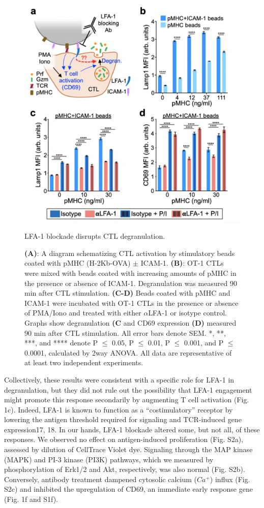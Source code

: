 \begin{figure}[htbp]
	\centering
	\includegraphics[width=1.0\columnwidth]{../figures/chapter3/fig1suppbeads.png}
	\caption{LFA-1 blockade disrupts CTL degranulation.}
	\caption*{\textbf{(A)}: A diagram schematizing CTL activation by stimulatory beads coated with pMHC (H-2Kb-OVA) $\pm$ ICAM-1. \textbf{(B)}: OT-1 CTLs were mixed with beads coated with increasing amounts of pMHC in the presence or absence of ICAM-1. Degranulation was measured 90 min after CTL stimulation. \textbf{(C-D)} Beads coated with pMHC and ICAM-1 were incubated with OT-1 CTLs in the presence or absence of PMA/Iono and treated with either $\alpha$LFA-1 or isotype control. Graphs show degranulation \textbf{(C} and CD69 expression \textbf{(D)} measured 90 min after CTL stimulation. All error bars denote SEM. *, **, ***, and **** denote P $\leq$ 0.05, P $\leq$ 0.01, P $\leq$ 0.001, and P $\leq$ 0.0001, calculated by 2way ANOVA. All data are representative of at least two independent experiments.}
	\label{fig:fig1suppbeads}
\end{figure} 
 
Collectively, these results were consistent with a specific role for LFA-1 in degranulation, but they did not rule out the possibility that LFA-1 engagement might promote this response secondarily by augmenting T cell activation (Fig. 1c). Indeed, LFA-1 is known to function as a “costimulatory” receptor by lowering the antigen threshold required for signaling and TCR-induced gene expression17, 18. In our hands, LFA-1 blockade altered some, but not all, of these responses. We observed no effect on antigen-induced proliferation (Fig. S2a), assessed by dilution of CellTrace Violet dye. Signaling through the MAP kinase (MAPK) and PI-3 kinase (PI3K) pathways, which we measured by phosphorylation of Erk1/2 and Akt, respectively, was also normal (Fig. S2b). Conversely, antibody treatment dampened cytosolic calcium ($Ca^{+}$) influx (Fig. S2c) and inhibited the upregulation of CD69, an immediate early response gene (Fig. 1f and S1f). 

